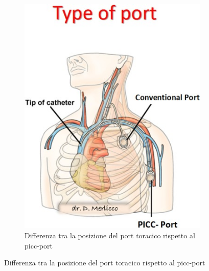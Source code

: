 \begin{figure}[H]
    \begin{center}
    \begin{subfigure}[b]{0.3\textwidth}
            \includegraphics[width=\linewidth]{img/picc-port.jpg}
            \caption{Differenza tra la posizione del port toracico rispetto al picc-port}
            

\end{subfigure}
\end{center}
\end{figure}
